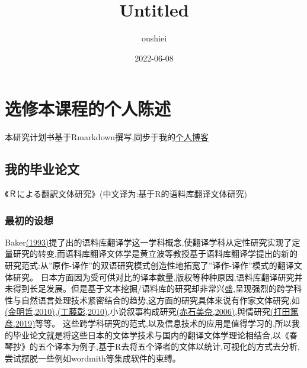 \documentclass[
]{article}
\title{Untitled}
\author{oushiei}
\date{2022-06-08}
\begin{document}
\maketitle

\hypertarget{ux9009ux4feeux672cux8bfeux7a0bux7684ux4e2aux4ebaux9648ux8ff0}{%
\section{选修本课程的个人陈述}\label{ux9009ux4feeux672cux8bfeux7a0bux7684ux4e2aux4ebaux9648ux8ff0}}

本研究计划书基于Rmarkdown撰写,同步于我的\href{https://oushiei.netlify.app/}{个人博客}

\hypertarget{ux6211ux7684ux6bd5ux4e1aux8bbaux6587}{%
\subsection{我的毕业论文}\label{ux6211ux7684ux6bd5ux4e1aux8bbaux6587}}

《Ｒによる翻訳文体研究》(中文译为:基于R的语料库翻译文体研究)

\hypertarget{ux6700ux521dux7684ux8bbeux60f3}{%
\subsubsection{最初的设想}\label{ux6700ux521dux7684ux8bbeux60f3}}

Baker\href{https://www.bing.com/search?q=Corpus+Linguistics+and+Translation+Studies+\%E2\%80\%94+Implications+and+Applications\&qs=n\&form=QBRE\&sp=-1\&pq=\&sc=0-0\&sk=\&cvid=3181E4590024439A9783249BD00EBF33}{(1993)}提了出的语料库翻译学这一学科概念,使翻译学科从定性研究实现了定量研究的转变,而语料库翻译文体学是黄立波等教授基于语料库翻译学提出的新的研究范式:从''原作-译作''的双语研究模式创造性地拓宽了''译作-译作''模式的翻译文体研究。
日本方面因为受可供对比的译本数量,版权等种种原因,语料库翻译研究并未得到长足发展。但是基于文本挖掘/语料库的研究却非常兴盛,呈现强烈的跨学科性与自然语言处理技术紧密结合的趋势,这方面的研究具体来说有作家文体研究,如\href{https://www.cis.doshisha.ac.jp/staff/jin/}{(金明哲,2010)},\href{https://cir.nii.ac.jp/crid/1390282679401094016}{(工藤彰,2010)},小说叙事构成研究\href{https://cir.nii.ac.jp/crid/1390282680082974080}{(赤石美奈,2006)},舆情研究\href{https://cir.nii.ac.jp/crid/1390285697600187520}{(打田篤彦,2019)}等等。
这些跨学科研究的范式,以及信息技术的应用是值得学习的,所以我的毕业论文就是将这些日本的文体学技术与国内的翻译文体学理论相结合,以《春琴抄》的五个译本为例子,基于R去将五个译者的文体以统计,可视化的方式去分析,尝试摆脱一些例如wordmith等集成软件的束缚。
\end{document}
